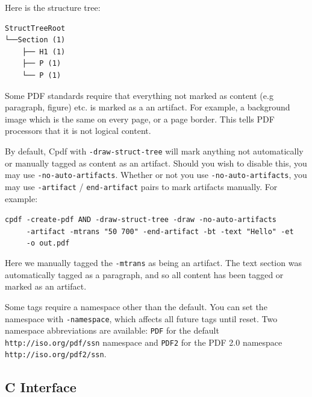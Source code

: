 \documentclass{book}
\begin{document}
\noindent Here is the structure tree:

\begin{verbatim}
StructTreeRoot
└──Section (1)
    ├── H1 (1)
    ├── P (1)
    └── P (1)
\end{verbatim}

\noindent Some PDF standards require that everything not marked as content (e.g paragraph, figure) etc. is marked as a an artifact. For example, a background image which is the same on every page, or a page border. This tells PDF processors that it is not logical content.

By default, Cpdf with \texttt{-draw-struct-tree} will mark anything not automatically or manually tagged as content as an artifact. Should you wish to disable this, you may use \texttt{-no-auto-artifacts}. Whether or not you use \texttt{-no-auto-artifacts}, you may use \texttt{-artifact} / \texttt{end-artifact} pairs to mark artifacts manually. For example:

\begin{framed}
   \noindent\small\verb!cpdf -create-pdf AND -draw-struct-tree -draw -no-auto-artifacts!\\
   \noindent\small\verb!     -artifact -mtrans "50 700" -end-artifact -bt -text "Hello" -et!\\
   \noindent\small\verb!     -o out.pdf!
\end{framed}

\noindent Here we manually tagged the \texttt{-mtrans} as being an artifact. The text section was automatically tagged as a paragraph, and so all content has been tagged or marked as an artifact.

Some tags require a namespace other than the default. You can set the namespace with \texttt{-namespace}, which affects all future tags until reset. Two namespace abbreviations are available: \texttt{PDF} for the default \texttt{http://iso.org/pdf/ssn} namespace and \texttt{PDF2} for the PDF 2.0 namespace \texttt{http://iso.org/pdf2/ssn}.

\fi%

\begin{cpdflib}
\clearpage
\section*{C Interface}
\begin{small}\tt

\end{small}
\end{cpdflib}
\end{document}
